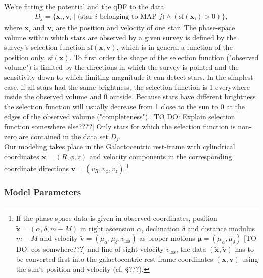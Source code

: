 \documentclass[12pt,preprint]{aastex}
\newcommand{\vect}[1]{\boldsymbol{#1}} %
\begin{document}
We're fitting the potential and the qDF to the data
\begin{eqnarray*}
D_j  =\{ \vect{x}_i,\vect{v}_i \mid \text{(star $i$ belonging to MAP $j$)} \wedge (\text{sf}(\vect{x_i}) > 0) \},
\end{eqnarray*}
where  $\vect{x}_i$ and $\vect{v}_i$ are the position and velocity of one star. The phase-space volume within which stars are observed by a given survey is defined by the survey's selection function $\text{sf}(\vect{x},\vect{v})$, which is in general a function of the position only, $\text{sf}(\vect{x})$. To first order the shape of the selection function ("observed volume") is limited by the directions in which the survey is pointed and the sensitivity down to which limiting magnitude it can detect stars. In the simplest case, if all stars had the same brightness, the selection function is 1 everywhere inside the observed volume and 0 outside. Because stars have different brightness the selection function will usually decrease from 1 close to the sun to 0 at the edges of the observed volume ("completeness"). [TO DO: Explain selection function somewhere else????] Only stars for which the selection function is non-zero are contained in the data set $D_j$.
\\Our modeling takes place in the Galactocentric rest-frame with cylindrical coordinates $\vect{x} = (R,\phi,z)$ and velocity components in the corresponding coordinate directions $\vect{v} = (v_R,v_\phi,v_z)$.\footnote{If the phase-space data is given in observed coordinates, position $\tilde{\vect{x}}=(\alpha,\delta,m-M)$ in right ascension $\alpha$, declination $\delta$ and distance modulus $m-M$ and velocity $\tilde{\vect{v}} = (\mu_\alpha,\mu_\delta,v_\text{los})$ as proper motions $\vect{\mu}=(\mu_\alpha,\mu_\delta)$ [TO DO: cos somwhere???] and line-of-sight velocity $v_\text{los}$, the data $(\tilde{\vect{x}},\tilde{\vect{v}})$ has to be converted first into the galactocentric rest-frame coordinates $(\vect{x},\vect{v})$ using the sun's position and velocity (cf. \S ???).}

\subsubsection{Model Parameters} \label{kap:modpar}
\end{document}
